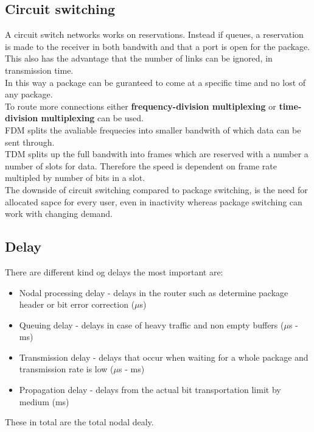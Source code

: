 \documentclass[12pt, a4paper]{article}
\begin{document}
		\subsection{Circuit switching}
			A circuit switch networks works on reservations. Instead if queues, a reservation is made to the receiver in both bandwith and that a port is open for the package.\\
			This also has the advantage that the number of links can be ignored, in transmission time.\\
			In this way a package can be guranteed to come at a specific time and no lost of any package.\\
			To route more connections either \textbf{frequency-division multiplexing} or \textbf{time-division multiplexing} can be used.\\
			FDM splits the avaliable frequecies into smaller bandwith of which data can be sent through.\\
			TDM splits up the full bandwith into frames which are reserved with a number a number of slots for data. Therefore the speed is dependent on frame rate multipled by number of bits in a slot.\\
			The downside of circuit switching compared to package switching, is the need for allocated sapce for every user, even in inactivity whereas package switching can work with changing demand.
		\subsection{Delay}
			There are different kind og delays the most important are:
			\begin{itemize}
				\item Nodal processing delay - delays in the router such as determine package header or bit error correction ($\mu$s)
				\item Queuing delay - delays in case of heavy traffic and non empty buffers ($\mu$s - ms)
				\item Transmission delay - delays that occur when waiting for a whole package and transmission rate is low  ($\mu$s - ms)
				\item Propagation delay - delays from the actual bit transportation limit by medium (ms)
			\end{itemize}
			These in total are the total nodal dealy.\\
			
\end{document}

